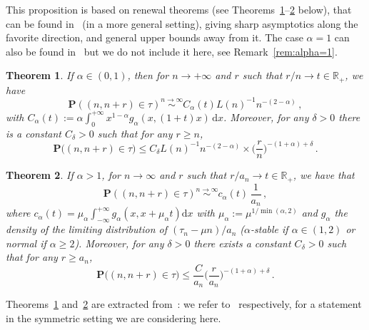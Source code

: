 \documentclass[10pt]{amsart}
\newtheorem{theo}{Theorem}[section]
\theoremstyle{definition}\newtheorem{defi}[theo]{Definition}\newtheorem{rema}[theo]{Remark}\newtheorem{exam}[theo]{Example}\newtheorem{exem}[theo]{Example}\newtheorem{nota}[theo]{Notation}
\newcommand{\ga}{\alpha}
\newcommand{\gd}{\delta}
\newcommand{\dd}{\mathrm{d}}
\newcommand{\bP}{\ensuremath{\mathbf{P}}}
\newcommand{\bbR}{\ensuremath{\mathbb{R}}}
\begin{document}
\begin{appendix}
This proposition is based on renewal theorems (see Theorems~\ref{th:re01}--\ref{th:reD} below), that can be found in~\cite{cf:B} (in a more general setting), giving sharp asymptotics along the favorite direction, and general upper bounds away from it. The case $\ga=1$ can also be found in~\cite{cf:B} but we do not include it here, see Remark~\ref{rem:alpha=1}.


\begin{theo}\label{th:re01}
If $\ga \in (0,1)$, then for $n\to+\infty $ and $r$ such that $r/n \to t \in \bbR_+$, we have
\begin{equation}\label{eq:D01}
\bP \left((n,n+r) \in \tau \right) \stackrel{n \to \infty}\sim C_{\ga}(t) L(n)^{-1} n^{-(2-\ga)}\,,
\end{equation}
with $C_{\ga}(t) := \ga \int_{0}^{+ \infty} x^{1- \ga} g_\ga (x, (1+t) x)\,\dd x$. Moreover, for any $\gd>0$ there is a constant $C_{\gd}>0$ such that for any $r\geq n$,
\begin{equation}
\bP\big((n,n+r)\in\tau \big) \leq C_{\gd} L(n)^{-1} n^{-(2-\ga)} \times \Big(\frac{r}{n} \Big)^{-(1+\ga) +\gd}\,.
\end{equation}
\end{theo}



\begin{theo}\label{th:reD}
If $\ga> 1$, for $n \to \infty$ and $r$ such that $r/a_n \to t \in \bbR_+$, we have that
\begin{equation}
\bP \left((n,n+r) \in \tau \right) \stackrel{n \to \infty}\sim c_{\ga}(t)\,\frac{1}{a_n}\,,
\end{equation}
where $c_{\ga}(t) = \mu_\ga \int_{- \infty}^{+ \infty} g_\ga (x,x+\mu_\ga t) \dd x$ with $\mu_\ga := \mu^{1/\min(\ga,2)}$ and $g_{\ga}$ the density of the limiting distribution of $(\tau_n -\mu n)/a_n$ ($\alpha$-stable if $\ga\in(1,2)$ or normal if $\ga\geq 2$). Moreover, for any $\gd>0$ there exists a constant $C_{\gd}>0$ such that for any $r\geq a_n$,
\begin{equation}\label{eq:offdiag}
\bP\big((n, n+r) \in \tau \big) \leq \frac{C}{a_n} \Big(\frac{r}{a_n} \Big)^{-(1+\ga) +\gd}\,.
\end{equation}
\end{theo}

Theorems~\ref{th:re01} and~\ref{th:reD} are extracted from~\cite[Theorems~3.1, 4.1 and Theorems~3.3, 4.2 respectively]{cf:B}: we refer to~\cite[Equations~(3.4), (4.2), (3.7), (4.5)]{cf:B} respectively, for a statement in the symmetric setting we are considering here.
\\[-0.5em]


\end{appendix}
\end{document}
